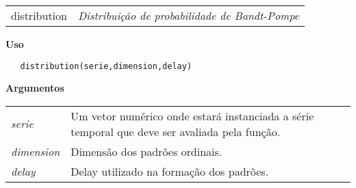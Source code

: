 
\hrulefill   

\begin{table}[!ht]
\begin{center}
\begin{tabularx}{\textwidth}{X X}
\hspace{0.5cm} distribution & \textit{Distribuição de probabilidade de Bandt-Pompe}\\
\end{tabularx}
\end{center}
\end{table} 

\vspace{-0.5cm}

\hrulefill  

\vspace{0.5cm}

\textbf{Uso}

\begin{lstlisting}
   distribution(serie,dimension,delay)
\end{lstlisting}

\vspace{0.5cm}

\textbf{Argumentos}

\begin{table}[!ht]
\begin{center}
\begin{tabularx}{\textwidth}{X X}
\hspace{0.5cm} \textit{serie} \vspace{0.5cm}& Um vetor numérico onde estará instanciada a série temporal que deve ser avaliada pela função.\vspace{0.5cm}\\
\hspace{0.5cm} \textit{dimension} \vspace{0.5cm}& Dimensão dos padrões ordinais.\vspace{0.5cm}\\
\hspace{0.5cm} \textit{delay} & Delay utilizado na formação dos padrões.\\
\end{tabularx}
\end{center}
\end{table} 

\newpage


